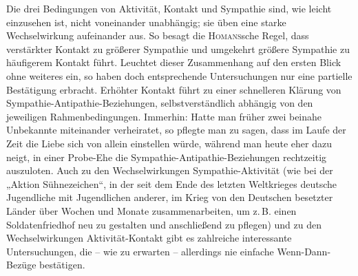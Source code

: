 \documentclass[12pt]{scrartcl}
\DeclareRobustCommand{\zB}{z.\,B.\xspace}
\begin{document}
Die drei Bedingungen von Aktivität, Kontakt und Sympathie sind, wie leicht
einzusehen ist, nicht voneinander unabhängig; sie üben eine starke
Wechselwirkung aufeinander aus. So besagt die \textsc{Homans}sche Regel, dass
verstärkter Kontakt zu größerer Sympathie und umgekehrt größere Sympathie zu
häufigerem Kontakt führt. Leuchtet dieser Zusammenhang auf den ersten Blick
ohne weiteres ein, so haben doch entsprechende Untersuchungen nur eine
partielle Bestätigung erbracht. Erhöhter Kontakt führt zu einer schnelleren
Klärung von Sympathie-Antipathie-Beziehungen, selbstverständlich abhängig von
den jeweiligen Rahmenbedingungen. Immerhin: Hatte man früher zwei beinahe
Unbekannte miteinander verheiratet, so pflegte man zu sagen, dass im Laufe der
Zeit die Liebe sich von allein einstellen würde, während man heute eher dazu
neigt, in einer Probe-Ehe die Sympathie-Antipathie-Beziehungen rechtzeitig
auszuloten. Auch zu den Wechselwirkungen Sympathie-Aktivität (wie bei der
„Aktion Sühnezeichen“, in der seit dem Ende des letzten Weltkrieges deutsche
Jugendliche mit Jugendlichen anderer, im Krieg von den Deutschen besetzter
Länder über Wochen und Monate zusammenarbeiten, um \zB einen
Soldatenfriedhof neu zu gestalten und anschließend zu pflegen) und zu den
Wechselwirkungen Aktivität-Kontakt gibt es zahlreiche interessante
Untersuchungen, die -- wie zu erwarten -- allerdings nie einfache
Wenn-Dann-Bezüge bestätigen.
\end{document}
